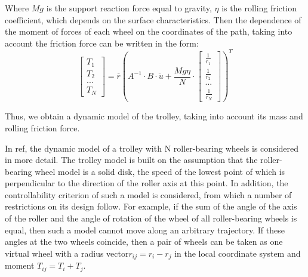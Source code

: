 \documentclass[oneside,final,14pt]{extreport}
\begin{document}
Where $ Mg $ is the support reaction force equal to gravity, $ \eta $ is the rolling friction coefficient, which depends on the surface characteristics. Then the dependence of the moment of forces of each wheel on the coordinates of the path, taking into account the friction force can be written in the form:
\begin{equation}
\begin{bmatrix}
T_{1} \\
T_{2} \\
... \\
T_{N}
\end{bmatrix}
=
\overline{r}
(
A^{-1}
\cdot
B 
\cdot
\ddot{u}
+
\frac{Mg\eta}{N}
\cdot
\begin{bmatrix}
\frac{1}{r_{1}} \\
\frac{1}{r_{2}} \\
...				\\
\frac{1}{r_{N}}
\end{bmatrix}
)^{T}
\end{equation} 

Thus, we obtain a dynamic model of the trolley, taking into account its mass and rolling friction force.

In ref, the dynamic model of a trolley with N roller-bearing wheels is considered in more detail. The trolley model is built on the assumption that the roller-bearing wheel model is a solid disk, the speed of the lowest point of which is perpendicular to the direction of the roller axis at this point. In addition, the controllability criterion of such a model is considered, from which a number of restrictions on its design follow. For example, if the sum of the angle of the axis of the roller and the angle of rotation of the wheel of all roller-bearing wheels is equal, then such a model cannot move along an arbitrary trajectory. If these angles at the two wheels coincide, then a pair of wheels can be taken as one virtual wheel with a radius vector$r_{ij} = r_{i} - r_{j}$ in the local coordinate system and moment $T_{ij} = T_{i} + T_{j}$.
	
\end{document}
